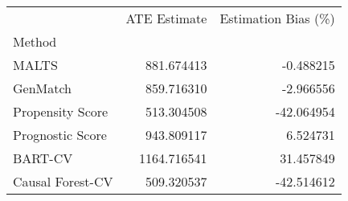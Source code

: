 \begin{tabular}{lrr}
\toprule
{} &  ATE Estimate &  Estimation Bias (\%) \\
Method           &               &                      \\
\midrule
MALTS            &    881.674413 &            -0.488215 \\
GenMatch         &    859.716310 &            -2.966556 \\
Propensity Score &    513.304508 &           -42.064954 \\
Prognostic Score &    943.809117 &             6.524731 \\
BART-CV          &   1164.716541 &            31.457849 \\
Causal Forest-CV &    509.320537 &           -42.514612 \\
\bottomrule
\end{tabular}
